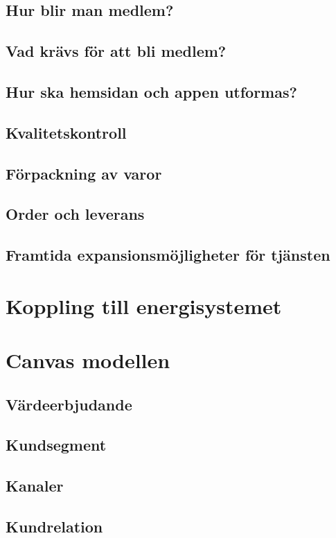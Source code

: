 \documentclass[10pt,a4paper,oneside]{article}
\begin{document}
\subsection{Hur blir man medlem?}
\subsection{Vad krävs för att bli medlem?}
\subsection{Hur ska hemsidan och appen utformas?}
\subsection{Kvalitetskontroll}
\subsection{Förpackning av varor}
\subsection{Order och leverans}
\subsection{Framtida expansionsmöjligheter för tjänsten }
\newpage

\section{Koppling till energisystemet}
\newpage

\section{Canvas modellen}
\subsection{Värdeerbjudande}
\subsection{Kundsegment}
\subsection{Kanaler}
\subsection{Kundrelation}
\end{document}
